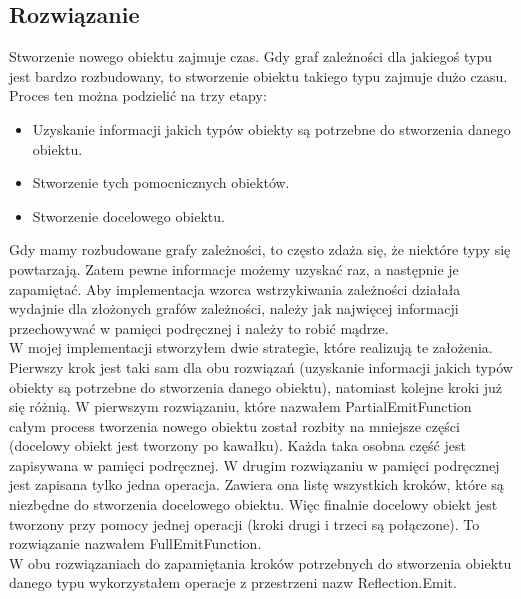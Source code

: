 \documentclass[12pt]{article}
\begin{document}
\subsection{Rozwiązanie}
Stworzenie nowego obiektu zajmuje czas. Gdy graf zależności dla jakiegoś typu jest bardzo rozbudowany, to stworzenie obiektu takiego typu zajmuje dużo czasu. Proces ten można podzielić na trzy etapy:
\begin{itemize}
	\item Uzyskanie informacji jakich typów obiekty są potrzebne do stworzenia danego obiektu.
	\item Stworzenie tych pomocnicznych obiektów.
	\item Stworzenie docelowego obiektu.
\end{itemize}
Gdy mamy rozbudowane grafy zależności, to często zdaża się, że niektóre typy się powtarzają. Zatem pewne informacje możemy uzyskać raz, a następnie je zapamiętać. Aby implementacja wzorca wstrzykiwania zależności działała wydajnie dla złożonych grafów zależności, należy jak najwięcej informacji przechowywać w pamięci podręcznej i należy to robić mądrze.\\
W mojej implementacji stworzyłem dwie strategie, które realizują te założenia. Pierwszy krok jest taki sam dla obu rozwiązań (uzyskanie informacji jakich typów obiekty są potrzebne do stworzenia danego obiektu), natomiast kolejne kroki już się różnią. W pierwszym rozwiązaniu, które nazwałem PartialEmitFunction całym process tworzenia nowego obiektu został rozbity na mniejsze części (docelowy obiekt jest tworzony po kawałku). Każda taka osobna część jest zapisywana w pamięci podręcznej. W drugim rozwiązaniu w pamięci podręcznej jest zapisana tylko jedna operacja. Zawiera ona listę wszystkich kroków, które są niezbędne do stworzenia docelowego obiektu. Więc finalnie docelowy obiekt jest tworzony przy pomocy jednej operacji (kroki drugi i trzeci są połączone). To rozwiązanie nazwałem FullEmitFunction.\\
W obu rozwiązaniach do zapamiętania kroków potrzebnych do stworzenia obiektu danego typu wykorzystałem operacje z przestrzeni nazw Reflection.Emit.
\end{document}
